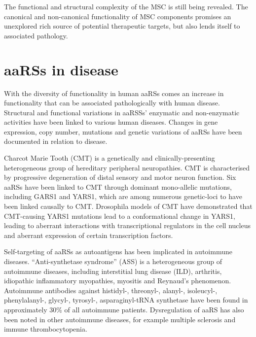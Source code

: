 The functional and structural complexity of the MSC is still being revealed.
The canonical and non-canonical functionality of MSC components promises an unexplored rich source of potential therapeutic targets, but also lends itself to associated pathology.

\section{aaRSs in disease}
With the diversity of functionality in human aaRSs comes an increase in functionality that can be associated pathologically with human disease.
Structural and functional variations in aaRSSs' enzymatic and non-enzymatic activities have been linked to various human diseases.
Changes in gene expression, copy number, mutations and genetic variations of aaRSs have been documented in relation to disease\cite{kwon2019aminoacyl}.

Charcot Marie Tooth (CMT) is a genetically and clinically-presenting heterogeneous group of hereditary peripheral neuropathies.
CMT is characterised by progressive degeneration of distal sensory and motor neuron function\cite{yao2013aminoacyl}.
Six aaRSs have been linked to CMT through dominant mono-allelic mutations, including GARS1 and YARS1, which are among numerous genetic-loci to have been linked causally to CMT.
Drosophila models of CMT have demonstrated that CMT-causing YARS1 mutations lead to a conformational change in YARS1, leading to aberrant interactions with transcriptional regulators in the cell nucleus and aberrant expression of certain transcription factors\cite{bervoets2019transcriptional}.

Self-targeting of aaRSs as autoantigens has been implicated in autoimmune diseases.
``Anti-synthetase syndrome'' (ASS) is a heterogeneous group of autoimmune diseases, including interstitial lung disease (ILD), arthritis, idiopathic inflammatory myopathies, myositis and Reynaud's phenomenon\cite{park2008aminoacyl}.
Autoimmune antibodies against histidyl-, threonyl-, alanyl-, isoleucyl-, phenylalanyl-, glycyl-, tyrosyl-, asparaginyl-tRNA synthetase have been found in approximately 30\% of all autoimmune patients\cite{park2008aminoacyl}.
Dysregulation of aaRS has also been noted in other autoimmune diseases, for example multiple sclerosis and immune thrombocytopenia\cite{nie2019roles}.

